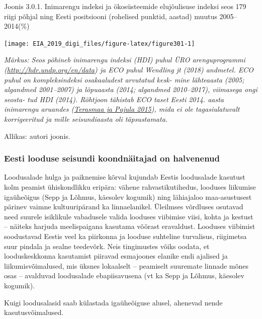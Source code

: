 \documentclass[estonian,]{article}
\begin{document}
{Joonis 3.0.1.} Inimarengu indeksi ja ökosüsteemide elujõulisuse indeksi seos 179 riigi põhjal ning Eesti positsiooni (rohelised punktid, aastad) muutus 2005--2014(\%)

\begin{center}\texttt{[image: EIA\_2019\_digi\_files/figure-latex/figure301-1]} \end{center}

\emph{Märkus:
Seos põhineb inimarengu indeksi (HDI) puhul ÜRO arenguprogrammi (\url{http://hdr.undp.org/en/data}) ja ECO puhul Wendling jt (2018) andmetel. ECO puhul on kompleksindeksi osakaaludest arvutatud kesk- mine lähteaasta (2005; algandmed 2001--2007) ja lõpuaasta (2014; algandmed 2010--2017), viimasega ongi seosta- tud HDI (2014). Rõhtjoon tähistab ECO taset Eesti 2014. aasta inimarengu aruandes (\protect\hyperlink{Terasmaa2015}{Terasmaa ja Pajula 2015}), mida ei ole tagasiulatuvalt korrigeeritud ja mille seisundiaasta oli täpsustamata.}

\begin{imgsource}
{Allikas:} autori joonis.
\end{imgsource}

\hypertarget{eesti-looduse-seisundi-koondnuxe4itajad-on-halvenenud-1}{%
\subsubsection*{Eesti looduse seisundi koondnäitajad on halvenenud}\label{eesti-looduse-seisundi-koondnuxe4itajad-on-halvenenud-1}}

Loodusalade hulga ja paiknemise kõrval kujundab Eestis loodusalade kasutust kolm peamist ühiskondlikku eripära: vähene rahvastikutihedus, looduses liikumise igaüheõigus (Sepp ja Lõhmus, käesolev kogumik) ning lähiajaloo maa-asustusest pärinev vaimne kultuuripärand ka linnaelanikel. Üleilmses võrdluses osutavad need suurele isiklikule vabadusele valida looduses viibimise viisi, kohta ja kestust -- näiteks harjuda meelispaigana kasutama võõrast eravaldust. Looduses viibimist soodustavad Eestis veel ka piirkonna ja looduse suhteline turvalisus, riigimetsa suur pindala ja sealne teedevõrk. Neis tingimustes võiks oodata, et looduskeskkonna kasutamist piiravad esmajoones elanike endi ajalised ja liikumisvõimalused, mis üksnes lokaalselt -- peamiselt suuremate linnade mõnes osas -- avalduvad loodusalade ebapiisavusena (vt ka Sepp ja Lõhmus, käesolev kogumik).

\begin{blockquote-right}
Kuigi loodusalasid saab külastada igaüheõiguse alusel, ahenevad nende
kasutusvõimalused.
\end{blockquote-right}
\end{document}
